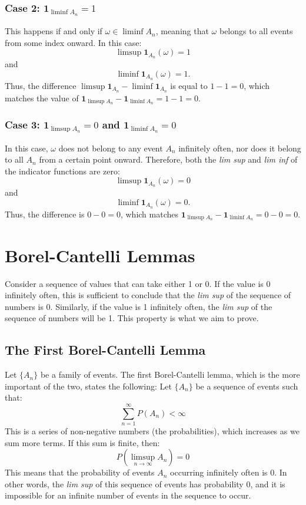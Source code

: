     \subsubsection{Case 2: $\mathbf{1}_{\liminf A_n} = 1$}
    This happens if and only if $\omega \in \liminf A_n$, meaning that $\omega$ belongs to all events from some index onward. In this case:
    \[
    \limsup \mathbf{1}_{A_n}(\omega) = 1
    \]
    and
    \[
    \liminf \mathbf{1}_{A_n}(\omega) = 1.
    \]
    Thus, the difference $\limsup \mathbf{1}_{A_n} - \liminf \mathbf{1}_{A_n}$ is equal to $1 - 1 = 0$, which matches the value of $\mathbf{1}_{\limsup A_n} - \mathbf{1}_{\liminf A_n} = 1 - 1 = 0$.
    
    \subsubsection{Case 3: $\mathbf{1}_{\limsup A_n} = 0$ and $\mathbf{1}_{\liminf A_n} = 0$}
    In this case, $\omega$ does not belong to any event $A_n$ infinitely often, nor does it belong to all $A_n$ from a certain point onward. Therefore, both the \textit{lim sup} and \textit{lim inf} of the indicator functions are zero:
    \[
    \limsup \mathbf{1}_{A_n}(\omega) = 0
    \]
    and
    \[
    \liminf \mathbf{1}_{A_n}(\omega) = 0.
    \]
    Thus, the difference is $0 - 0 = 0$, which matches $\mathbf{1}_{\limsup A_n} - \mathbf{1}_{\liminf A_n} = 0 - 0 = 0$.
    
    \section{Borel-Cantelli Lemmas}
    Consider a sequence of values that can take either 1 or 0. If the value is 0 infinitely often, this is sufficient to conclude that the \textit{lim sup} of the sequence of numbers is 0. Similarly, if the value is 1 infinitely often, the \textit{lim sup} of the sequence of numbers will be 1. This property is what we aim to prove.
    
    \subsection{The First Borel-Cantelli Lemma}
    Let $\{A_n\}$ be a family of events. The first Borel-Cantelli lemma, which is the more important of the two, states the following: \newline
    Let $\{A_n\}$ be a sequence of events such that:
    \[
    \sum_{n=1}^{\infty} P(A_n) < \infty
    \]
    This is a series of non-negative numbers (the probabilities), which increases as we sum more terms. If this sum is finite, then:
    \[
    P(\limsup_{n \to \infty} A_n) = 0
    \]
    This means that the probability of events $A_n$ occurring infinitely often is 0. In other words, the \textit{lim sup} of this sequence of events has probability 0, and it is impossible for an infinite number of events in the sequence to occur.
    
